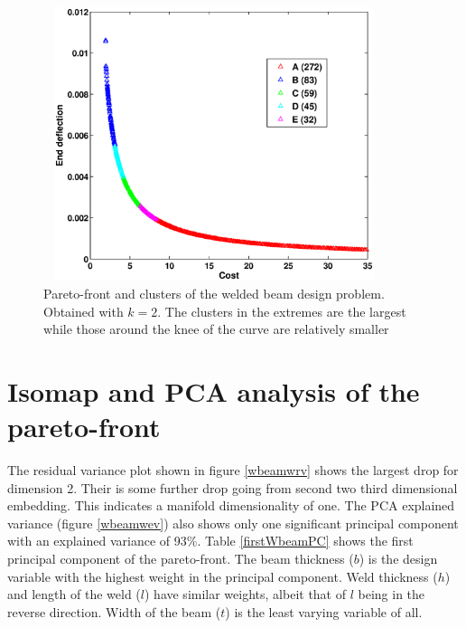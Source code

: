 \begin{figure}[ht]\begin{center}
 \includegraphics[width=100mm, height=80mm]{dia/wbeamParetoClusters.eps}
 \caption{Pareto-front and clusters of the welded beam design
   problem. Obtained with $k = 2$. The clusters in the extremes are the
   largest while those around the knee of the curve are relatively smaller}
 \label{wbeam}
\end{center}\end{figure}

\section{Isomap and PCA analysis of the pareto-front}

The residual variance plot shown in figure \ref{wbeamwrv} shows the largest
drop for dimension 2. Their is some further drop going from second two
third dimensional embedding. This indicates a manifold dimensionality of
one. The PCA explained variance (figure \ref{wbeamwev}) also shows only one
significant principal component with an explained variance of 93\%. Table
\ref{firstWbeamPC} shows the first principal component of the pareto-front.
The beam thickness ($b$) is the design variable with the highest weight in
the principal component. Weld thickness ($h$) and length of the weld ($l$)
have similar weights, albeit that of $l$ being in the reverse direction.
Width of the beam ($t$) is the least varying variable of all.

